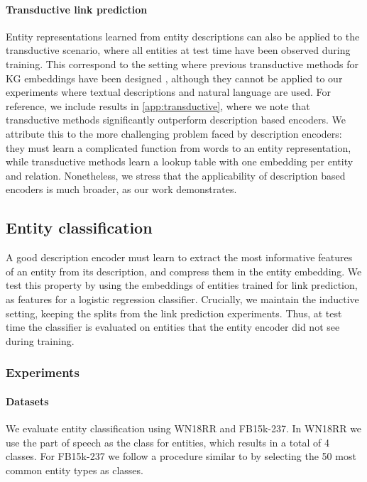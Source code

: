 \documentclass[sigconf]{acmart}
\begin{document}
\paragraph{Transductive link prediction} Entity representations learned from entity descriptions can also be applied to the transductive scenario, where all entities at test time have been observed during training. This correspond to the setting where previous transductive methods for KG embeddings have been designed \cite{bordes2011learning,bordes2013translating,yang2015embedding,trouillon2016complex,kazemi2018simple}, although they cannot be applied to our experiments where textual descriptions and natural language are used. For reference, we include results in \autoref{app:transductive}, where we note that transductive methods significantly outperform description based encoders. We attribute this to the more challenging problem faced by description encoders: they must learn a complicated function from words to an entity representation, while transductive methods learn a lookup table with one embedding per entity and relation. Nonetheless, we stress that the applicability of description based encoders is much broader, as our work demonstrates.

\subsection{Entity classification}

A good description encoder must learn to extract the most informative features of an entity from its description, and compress them in the entity embedding. We test this property by using the embeddings of entities trained for link prediction, as features for a logistic regression classifier. Crucially, we maintain the inductive setting, keeping the splits from the link prediction experiments. Thus, at test time the classifier is evaluated on entities that the entity encoder did not see during training.

\subsubsection{Experiments}

\paragraph{Datasets} We evaluate entity classification using WN18RR and FB15k-237. In WN18RR we use the part of speech as the class for entities, which results in a total of 4 classes. For FB15k-237 we follow a procedure similar to \citet{xie2016RepresentationLO} by selecting the 50 most common entity types as classes.
\end{document}
